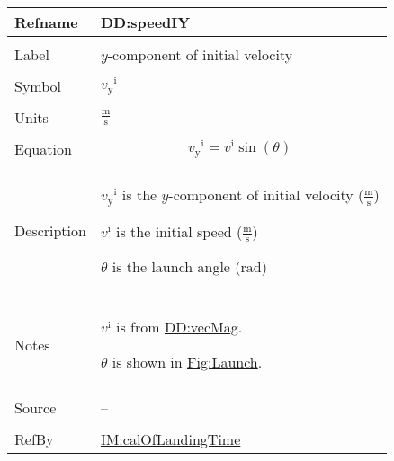 \documentclass[12pt]{article}
\begin{document}
\vspace{\baselineskip}
\noindent
\begin{minipage}{\textwidth}
\begin{tabular}{>{\raggedright}p{}>{\raggedright\arraybackslash}p{}}
\toprule \textbf{Refname} & \textbf{DD:speedIY}
\label{DD:speedIY}
\\ \midrule \\
Label & $y$-component of initial velocity
        
\\ \midrule \\
Symbol & ${{v_{\text{y}}}^{\text{i}}}$
         
\\ \midrule \\
Units & $\frac{\text{m}}{\text{s}}$
        
\\ \midrule \\
Equation & \begin{displaymath}
           {{v_{\text{y}}}^{\text{i}}}={v^{\text{i}}} \sin\left(θ\right)
           \end{displaymath}
\\ \midrule \\
Description & \begin{symbDescription}
              \item{${{v_{\text{y}}}^{\text{i}}}$ is the $y$-component of initial velocity ($\frac{\text{m}}{\text{s}}$)}
              \item{${v^{\text{i}}}$ is the initial speed ($\frac{\text{m}}{\text{s}}$)}
              \item{$θ$ is the launch angle (${\text{rad}}$)}
              \end{symbDescription}
\\ \midrule \\
Notes & ${v^{\text{i}}}$ is from \hyperref[DD:vecMag]{DD:vecMag}.
        
        $θ$ is shown in \hyperref[Figure:Launch]{Fig:Launch}.
        
\\ \midrule \\
Source & --
         
\\ \midrule \\
RefBy & \hyperref[IM:calOfLandingTime]{IM:calOfLandingTime}
        
\\ \bottomrule
\end{tabular}
\end{minipage}
\end{document}
